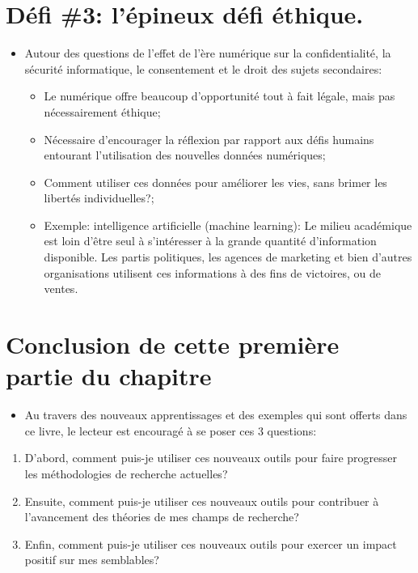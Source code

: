 \documentclass[
  letterpaper,
]{scrbook}
\providecommand{\tightlist}{%
  \setlength{\itemsep}{0pt}\setlength{\parskip}{0pt}}\usepackage{longtable,booktabs,array}
\begin{document}
\hypertarget{duxe9fi-3-luxe9pineux-duxe9fi-uxe9thique.}{%
\section{Défi \#3: l'épineux défi
éthique.}\label{duxe9fi-3-luxe9pineux-duxe9fi-uxe9thique.}}

\begin{itemize}
\tightlist
\item
  Autour des questions de l'effet de l'ère numérique sur la
  confidentialité, la sécurité informatique, le consentement et le droit
  des sujets secondaires:

  \begin{itemize}
  \tightlist
  \item
    Le numérique offre beaucoup d'opportunité tout à fait légale, mais
    pas nécessairement éthique;
  \item
    Nécessaire d'encourager la réflexion par rapport aux défis humains
    entourant l'utilisation des nouvelles données numériques;
  \item
    Comment utiliser ces données pour améliorer les vies, sans brimer
    les libertés individuelles?;
  \item
    Exemple: intelligence artificielle (machine learning): Le milieu
    académique est loin d'être seul à s'intéresser à la grande quantité
    d'information disponible. Les partis politiques, les agences de
    marketing et bien d'autres organisations utilisent ces informations
    à des fins de victoires, ou de ventes.
  \end{itemize}
\end{itemize}

\hypertarget{conclusion-de-cette-premiuxe8re-partie-du-chapitre}{%
\section{Conclusion de cette première partie du
chapitre}\label{conclusion-de-cette-premiuxe8re-partie-du-chapitre}}

\begin{itemize}
\tightlist
\item
  Au travers des nouveaux apprentissages et des exemples qui sont
  offerts dans ce livre, le lecteur est encouragé à se poser ces 3
  questions:
\end{itemize}

\begin{enumerate}
\def\labelenumi{\arabic{enumi}.}
\tightlist
\item
  D'abord, comment puis-je utiliser ces nouveaux outils pour faire
  progresser les méthodologies de recherche actuelles?
\item
  Ensuite, comment puis-je utiliser ces nouveaux outils pour contribuer
  à l'avancement des théories de mes champs de recherche?
\item
  Enfin, comment puis-je utiliser ces nouveaux outils pour exercer un
  impact positif sur mes semblables?
\end{enumerate}
\end{document}
